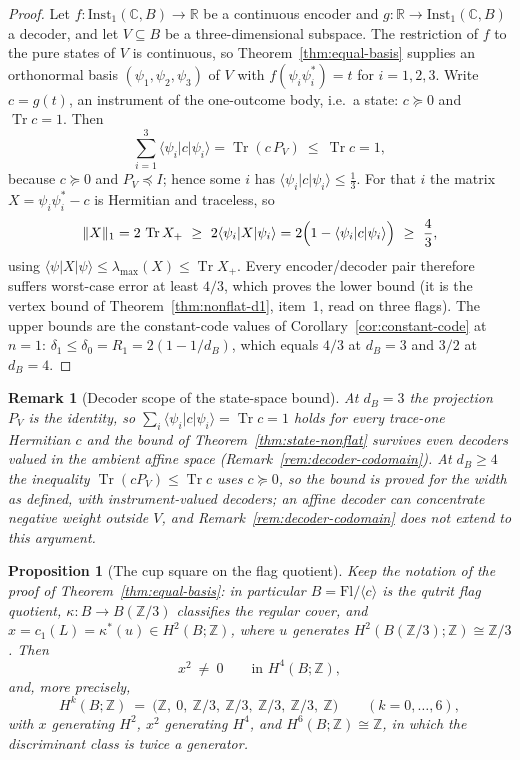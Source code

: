 \documentclass[11pt,a4paper]{article}
\newtheorem{proposition}[theorem]{Proposition}
\newtheorem{remark}[theorem]{Remark}
\newcommand{\Inst}{\mathrm{Inst}}
\newcommand{\Tr}{\operatorname{Tr}}
\begin{document}
\begin{proof}
Let $f\colon\Inst_1(\mathbb C,B)\to\mathbb R$ be a continuous encoder and
$g\colon\mathbb R\to\Inst_1(\mathbb C,B)$ a decoder, and let $V\subseteq B$ be a
three-dimensional subspace. The restriction of $f$ to the pure states of $V$ is
continuous, so Theorem~\ref{thm:equal-basis} supplies an orthonormal basis
$(\psi_1,\psi_2,\psi_3)$ of $V$ with
$f(\psi_i\psi_i^*)=t$ for $i=1,2,3$. Write $c=g(t)$, an instrument of the
one-outcome body, i.e.\ a state: $c\succeq0$ and $\Tr c=1$. Then
\[
\sum_{i=1}^3\langle\psi_i|c|\psi_i\rangle
=\Tr(c\,P_V)\ \le\ \Tr c=1,
\]
because $c\succeq0$ and $P_V\preceq I$; hence some $i$ has
$\langle\psi_i|c|\psi_i\rangle\le\tfrac13$. For that $i$ the matrix
$X=\psi_i\psi_i^*-c$ is Hermitian and traceless, so
\[
\|X\|_1=2\,\Tr X_+\ \ge\ 2\langle\psi_i|X|\psi_i\rangle
=2\Bigl(1-\langle\psi_i|c|\psi_i\rangle\Bigr)\ \ge\ \frac43,
\]
using $\langle\psi|X|\psi\rangle\le\lambda_{\max}(X)\le\Tr X_+$. Every
encoder/decoder pair therefore suffers worst-case error at least $4/3$, which
proves the lower bound (it is the vertex bound of Theorem~\ref{thm:nonflat-d1},
item~1, read on three flags). The upper bounds are the constant-code values of
Corollary~\ref{cor:constant-code} at $n=1$:
$\delta_1\le\delta_0=R_1=2(1-1/d_B)$, which equals $4/3$ at $d_B=3$ and $3/2$ at
$d_B=4$.
\end{proof}

\begin{remark}[Decoder scope of the state-space bound]
\label{rem:affine-scope}
At $d_B=3$ the projection $P_V$ is the identity, so
$\sum_i\langle\psi_i|c|\psi_i\rangle=\Tr c=1$ holds for every trace-one
Hermitian $c$ and the bound of Theorem~\ref{thm:state-nonflat} survives even
decoders valued in the ambient affine space (Remark~\ref{rem:decoder-codomain}).
At $d_B\ge4$ the inequality $\Tr(cP_V)\le\Tr c$ uses $c\succeq0$, so the bound is
proved for the width as defined, with instrument-valued decoders; an affine
decoder can concentrate negative weight outside $V$, and
Remark~\ref{rem:decoder-codomain} does not extend to this argument. \end{remark}


\begin{proposition}[The cup square on the flag quotient]
\label{prop:cupsquare}
Keep the notation of the proof of Theorem~\ref{thm:equal-basis}: in
particular $B=\mathrm{Fl}/\langle c\rangle$ is the qutrit flag quotient,
$\kappa\colon B\to B(\mathbb Z/3)$ classifies the regular cover, and
$x=c_1(L)=\kappa^*(u)\in H^2(B;\mathbb Z)$, where $u$ generates
$H^2(B(\mathbb Z/3);\mathbb Z)\cong\mathbb Z/3$. Then
\[
x^2\ \ne\ 0\qquad\text{in }H^4(B;\mathbb Z),
\]
and, more precisely,
\[
H^k(B;\mathbb Z)\ =\ \bigl(\mathbb Z,\ 0,\ \mathbb Z/3,\ \mathbb Z/3,\
\mathbb Z/3,\ \mathbb Z/3,\ \mathbb Z\bigr)\qquad(k=0,\dots,6),
\]
with $x$ generating $H^2$, $x^2$ generating $H^4$, and
$H^6(B;\mathbb Z)\cong\mathbb Z$, in which the discriminant class is twice a
generator.
\end{proposition}
\end{document}
